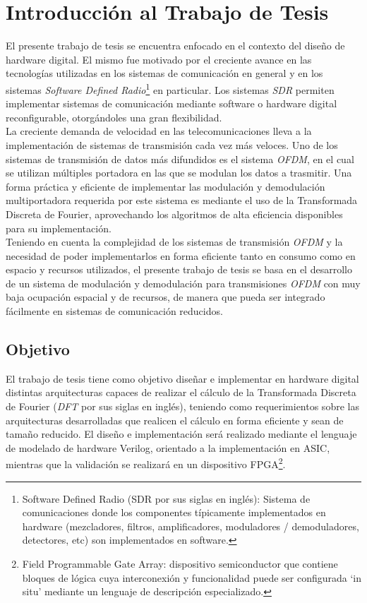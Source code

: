 \chapter{Introducción al Trabajo de Tesis}

El presente trabajo de tesis se encuentra enfocado en el contexto del diseño de hardware digital. El
mismo fue motivado por el creciente avance en las tecnologías utilizadas en los sistemas de
comunicación en general y en los sistemas \textit{Software Defined
Radio}\footnote{\label{SDR}Software Defined Radio (SDR por sus siglas en inglés): Sistema de
comunicaciones donde los componentes típicamente implementados en hardware (mezcladores, filtros, amplificadores, moduladores / demoduladores, detectores, etc) son
implementados en software.} en particular.
Los sistemas \textit{SDR} permiten implementar sistemas de comunicación mediante software o hardware digital reconfigurable, otorgándoles una gran flexibilidad.\\

La creciente demanda de velocidad en las telecomunicaciones lleva a la implementación de sistemas de
transmisión cada vez más veloces. Uno de los sistemas de transmisión de datos más difundidos es el
sistema \textit{OFDM}, en el cual se utilizan múltiples portadora en las que se modulan los
datos a trasmitir. Una forma práctica y eficiente de implementar las modulación y demodulación
multiportadora requerida por este sistema es mediante el uso de la Transformada Discreta de
Fourier, aprovechando los algoritmos de alta eficiencia disponibles para su implementación.\\

Teniendo en cuenta la complejidad de los sistemas de transmisión \textit{OFDM} y la necesidad de
poder implementarlos en forma eficiente tanto en consumo como en espacio y recursos utilizados, el
presente trabajo de tesis se basa en el desarrollo de un sistema de modulación y demodulación para
transmisiones \textit{OFDM} con muy baja ocupación espacial y de recursos, de manera que pueda ser
integrado fácilmente en sistemas de comunicación reducidos.

\section{Objetivo}
El trabajo de tesis tiene como objetivo diseñar e implementar en hardware digital distintas
arquitecturas capaces de realizar el cálculo de la Transformada Discreta de Fourier (\textit{DFT}
por sus siglas en inglés), teniendo como requerimientos sobre las arquitecturas desarrolladas que
realicen el cálculo en forma eficiente y sean de tamaño reducido. El diseño e implementación será
realizado mediante el lenguaje de modelado de hardware Verilog, orientado a la implementación en
ASIC, mientras que la validación se realizará en un dispositivo FPGA\footnote{\label{FPGA}Field Programmable
Gate Array:
dispositivo semiconductor que contiene bloques de lógica cuya interconexión y funcionalidad
puede ser configurada `in situ' mediante un lenguaje de descripción
especializado.}.\\

